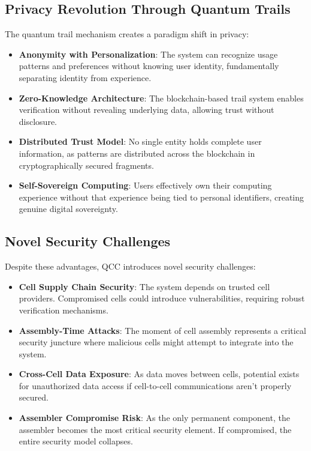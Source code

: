\documentclass[11pt,a4paper]{article}
\begin{document}
\subsection{Privacy Revolution Through Quantum Trails}

The quantum trail mechanism creates a paradigm shift in privacy:

\begin{itemize}
    \item \textbf{Anonymity with Personalization}: The system can recognize usage patterns and preferences without knowing user identity, fundamentally separating identity from experience.
    
    \item \textbf{Zero-Knowledge Architecture}: The blockchain-based trail system enables verification without revealing underlying data, allowing trust without disclosure.
    
    \item \textbf{Distributed Trust Model}: No single entity holds complete user information, as patterns are distributed across the blockchain in cryptographically secured fragments.
    
    \item \textbf{Self-Sovereign Computing}: Users effectively own their computing experience without that experience being tied to personal identifiers, creating genuine digital sovereignty.
\end{itemize}

\subsection{Novel Security Challenges}

Despite these advantages, QCC introduces novel security challenges:

\begin{itemize}
    \item \textbf{Cell Supply Chain Security}: The system depends on trusted cell providers. Compromised cells could introduce vulnerabilities, requiring robust verification mechanisms.
    
    \item \textbf{Assembly-Time Attacks}: The moment of cell assembly represents a critical security juncture where malicious cells might attempt to integrate into the system.
    
    \item \textbf{Cross-Cell Data Exposure}: As data moves between cells, potential exists for unauthorized data access if cell-to-cell communications aren't properly secured.
    
    \item \textbf{Assembler Compromise Risk}: As the only permanent component, the assembler becomes the most critical security element. If compromised, the entire security model collapses.
\end{itemize}
\end{document}
